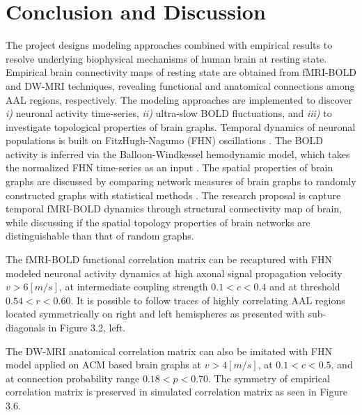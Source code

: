 
\chapter{Conclusion and Discussion}  %

\label{Chapter4} %


The project designs modeling approaches combined with empirical results to resolve underlying biophysical mechanisms of human brain at resting state. Empirical brain connectivity maps of resting state are obtained from fMRI-BOLD and DW-MRI techniques, revealing functional and anatomical connections among AAL regions, respectively. The modeling approaches are implemented to discover \textit{i)} neuronal activity time-series, \textit{ii)} ultra-slow BOLD fluctuations, and \textit{iii)} to investigate topological properties of brain graphs. Temporal dynamics of neuronal populations is built on FitzHugh-Nagumo (FHN) oscillations \citep{GHO08, VUK13, DEC09, FIT61}. The BOLD activity is inferred via the Balloon-Windkessel hemodynamic model, which takes the normalized FHN time-series as an input \citep{FRI00, VUK13}. The spatial properties of brain graphs are discussed by comparing network measures of brain graphs to randomly constructed graphs with statistical methods \citep{BUL09, RUB09, NEW10}. The research proposal  is capture temporal fMRI-BOLD dynamics through structural connectivity map of brain, while discussing if the spatial topology properties of brain networks are distinguishable than that of random graphs. 

The fMRI-BOLD functional correlation matrix can be recaptured with FHN modeled neuronal activity dynamics at high axonal signal propagation velocity $v>6[m/s]$, at intermediate coupling strength $0.1<c<0.4$ and at threshold $0.54<r<0.60$. It is possible to follow traces of highly correlating AAL regions located symmetrically on right and left hemispheres as presented with sub-diagonals in Figure 3.2, left.  

The DW-MRI anatomical correlation matrix can also be imitated with FHN model applied on ACM based brain graphs at $v>4[m/s]$, at $0.1<c<0.5$, and at connection probability range $0.18<p<0.70$. The symmetry of empirical correlation matrix is preserved in simulated correlation matrix as seen in Figure 3.6.

